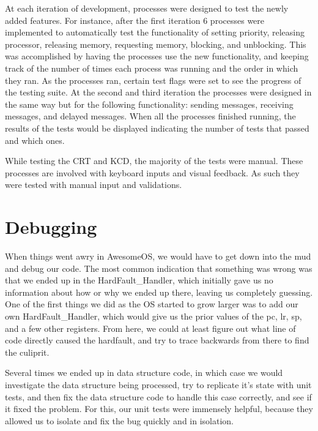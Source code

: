 \documentclass[12pt]{report}
\begin{document}
At each iteration of development, processes were designed to test the newly added features. For instance, after the first iteration 6 processes were implemented to automatically test the functionality of setting priority, releasing processor, releasing memory, requesting memory, blocking, and unblocking. This was accomplished by having the processes use the new functionality, and keeping track of the number of times each process was running and the order in which they ran. As the processes ran, certain test flags were set to see the progress of the testing suite. At the second and third iteration the processes were designed in the same way but for the following functionality: sending messages, receiving messages, and delayed messages.  When all the processes finished running, the results of the tests would be displayed indicating the number of tests that passed and which ones.

While testing the CRT and KCD, the majority of the tests were manual. These processes are involved with keyboard inputs and visual feedback. As such they were tested with manual input and validations.

\section{Debugging}
When things went awry in AwesomeOS, we would have to get down into the mud and debug our code. The most common indication that something was wrong was that we ended up in the HardFault\_Handler, which initially gave us no information about how or why we ended up there, leaving us completely guessing. One of the first things we did as the OS started to grow larger was to add our own HardFault\_Handler, which would give us the prior values of the pc, lr, sp, and a few other registers. From here, we could at least figure out what line of code directly caused the hardfault, and try to trace backwards from there to find the culiprit.

Several times we ended up in data structure code, in which case we would investigate the data structure being processed, try to replicate it's state with unit tests, and then fix the data structure code to handle this case correctly, and see if it fixed the problem. For this, our unit tests were immensely helpful, because they allowed us to isolate and fix the bug quickly and in isolation.
\end{document}

